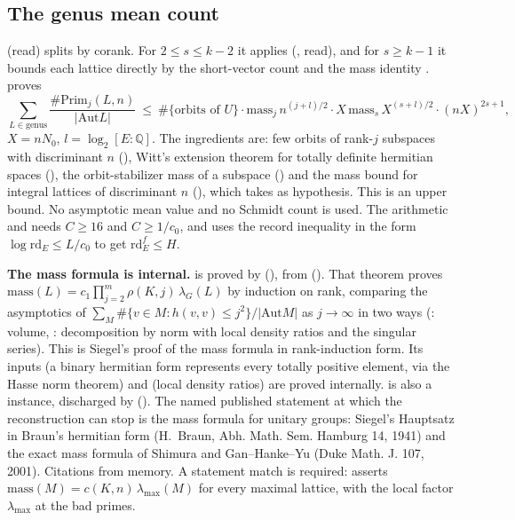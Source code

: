 \documentclass[11pt]{article}
\newcommand{\rd}{\mathrm{rd}}
\begin{document}
\subsection{The genus mean count}\label{sec:mean}

 (read) splits by corank. For $2\le s\le k-2$ it applies  (, read), and for $s\ge k-1$ it bounds each lattice directly by the short-vector count  and the mass identity .  proves
\[
\sum_{L\in\mathrm{genus}}\frac{\#\mathrm{Prim}_j(L,n)}{|\mathrm{Aut}L|}\ \le\ \#\{\text{orbits of }U\}\cdot \mathrm{mass}_j\,n^{(j+l)/2}\cdot X\,\mathrm{mass}_s\,X^{(s+l)/2}\cdot(nX)^{2s+1},
\]
$X=nN_0$, $l=\log_2[E:\mathbb Q]$. The ingredients are: few orbits of rank-$j$ subspaces with discriminant $n$ (), Witt's extension theorem for totally definite hermitian spaces (), the orbit-stabilizer mass of a subspace () and the mass bound for integral lattices of discriminant $n$ (), which takes  as hypothesis. This is an upper bound. No asymptotic mean value and no Schmidt count is used. The arithmetic  and  needs $C\ge16$ and $C\ge1/c_0$, and  uses the record inequality in the form $\log\rd_E\le L/c_0$ to get $\rd_E^f\le H$.

\textbf{The mass formula is internal.}  is proved by  (), from  (). That theorem proves $\mathrm{mass}(L)=c_1\prod_{j=2}^m\rho(K,j)\,\lambda_G(L)$ by induction on rank, comparing the asymptotics of $\sum_M\#\{v\in M:h(v,v)\le j^2\}/|\mathrm{Aut}M|$ as $j\to\infty$ in two ways (: volume, : decomposition by norm with local density ratios and the singular series). This is Siegel's proof of the mass formula in rank-induction form. Its inputs  (a binary hermitian form represents every totally positive element, via the Hasse norm theorem) and  (local density ratios) are proved internally.  is also a  instance, discharged by  (). The named published statement at which the reconstruction can stop is the mass formula for unitary groups: Siegel's Hauptsatz in Braun's hermitian form (H.~Braun, Abh. Math. Sem. Hamburg 14, 1941) and the exact mass formula of Shimura and Gan--Hanke--Yu (Duke Math. J. 107, 2001). Citations from memory. A statement match is required:  asserts $\mathrm{mass}(M)=c(K,n)\,\lambda_{\max}(M)$ for every maximal lattice, with the local factor $\lambda_{\max}$ at the bad primes.
\end{document}
